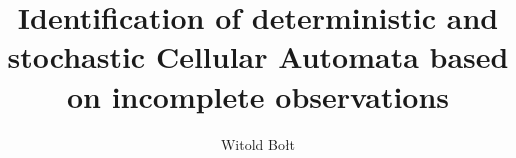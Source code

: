 
\title{Identification of deterministic and stochastic Cellular Automata based on incomplete observations}
\author{Witold Bołt}

\department{}


\pdTwoName{}
\pdTwoSchool{}
\pdTwoYear{}
